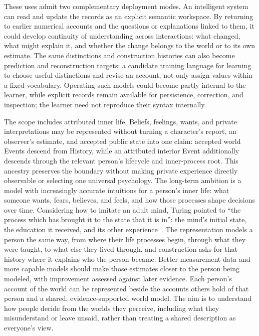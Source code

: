 \documentclass[11pt,a4paper]{article}
\begin{document}
These uses admit two complementary deployment modes. An intelligent system can read and update the
records as an explicit semantic workspace. By returning to earlier numerical
accounts and the questions or explanations linked to them, it could develop
continuity of understanding across interactions: what changed, what might
explain it, and whether the change belongs to the world or to its own estimate.
The same distinctions and construction histories can also become prediction and
reconstruction targets: a candidate training language for learning to choose
useful distinctions and revise an account, not only assign values within a
fixed vocabulary. Operating such models could become partly internal to the
learner, while explicit records remain available for persistence, correction,
and inspection; the learner need not reproduce their syntax internally.

The scope includes attributed inner life. Beliefs, feelings, wants, and private
interpretations may be represented without turning a character's report, an
observer's estimate, and accepted public state into one claim: accepted world
Events descend from History, while an attributed interior Event additionally
descends through the relevant person's lifecycle and inner-process root. This
ancestry preserves the boundary without making private experience directly
observable or selecting one universal psychology. The
long-term ambition is a model with increasingly accurate intuitions for a
person's inner life: what someone wants, fears, believes, and feels, and how
those processes shape decisions over time. Considering how to imitate an adult
mind, Turing pointed to ``the process which has brought it to the state that it
is in'': the mind's initial state, the education it received, and its other
experience~\cite{turing1950computing}. The representation models a person the
same way, from where their life processes begin, through what they were taught,
to what else they lived through, and construction asks for that history where it
explains who the person became. Better measurement data and more capable models
should make those estimates closer to the person being modeled, with
improvement assessed against later evidence. Each person's account of the world
can be represented beside the accounts others hold of that person and a shared,
evidence-supported world model. The aim is to understand how people decide from
the worlds they perceive, including what they misunderstand or leave unsaid,
rather than treating a shared description as everyone's view.
\end{document}
